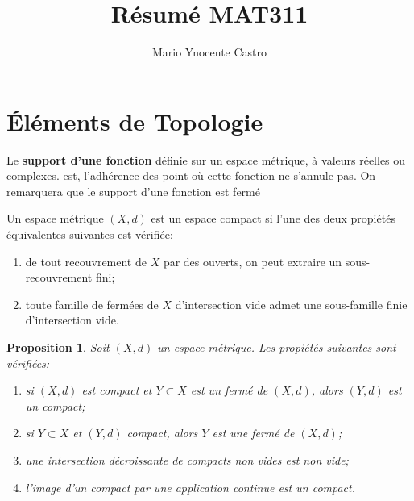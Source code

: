 \documentclass[10pt,a4paper,oneside]{article}
\newtheorem{proposition}{Proposition}
\newenvironment{definition}[1][Definition]{\begin{trivlist}
\item[\hskip \labelsep {\bfseries #1}]}{\end{trivlist}}
\begin{document}
\title{Résumé MAT311}
\author{Mario Ynocente Castro}

\maketitle

\section{Éléments de Topologie}

\begin{definition}
Le \textbf{support d'une fonction} définie sur un espace métrique, à valeurs réelles ou complexes. est, l'adhérence des point où cette fonction ne s'annule pas. On remarquera que le support d'une fonction est fermé
\end{definition}

\begin{definition}
Un espace métrique $(X,d)$ est un espace compact si l'une des deux propiétés équivalentes suivantes est vérifiée:

\begin{enumerate}
\item
de tout recouvrement de $X$ par des ouverts, on peut extraire un sous-recouvrement fini;

\item
toute famille de fermées de $X$ d'intersection vide admet une sous-famille finie d'intersection vide.
\end{enumerate}
\end{definition}

\begin{proposition}
Soit $(X,d)$ un espace métrique. Les propiétés suivantes sont vérifiées:

\begin{enumerate}
\item
si $(X,d)$ est compact et $Y \subset X$ est un fermé de $(X,d)$, alors $(Y,d)$ est un compact;

\item
si $Y \subset X$ et $(Y,d)$ compact, alors $Y$ est une fermé de $(X,d)$;

\item
une intersection décroissante de compacts non vides est non vide;

\item
l'image d'un compact par une application continue est un compact.
\end{enumerate}
\end{proposition}
\end{document}
